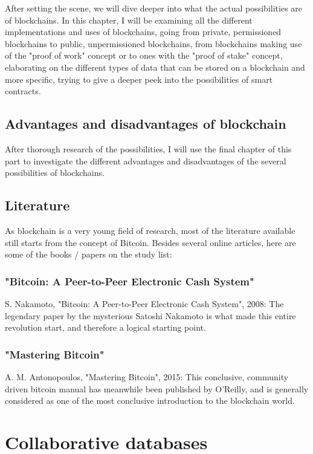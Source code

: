 \documentclass[11pt,a4paper]{article}
\begin{document}
After setting the scene, we will dive deeper into what the actual possibilities are of blockchains. In this chapter, I will be examining all the different implementations and uses of blockchains, going from private, permissioned blockchains to public, unpermissioned blockchains, from blockchains making use of the "proof of work" concept or to ones with the "proof of stake" concept, elaborating on the different types of data that can be stored on a blockchain and more specific, trying to give a deeper peek into the possibilities of smart contracts.

\subsection{Advantages and disadvantages of blockchain}

After thorough research of the possibilities, I will use the final chapter of this part to investigate the different advantages and disadvantages of the several possibilities of blockchains.

\subsection{Literature}

As blockchain is a very young field of research, most of the literature available still starts from the concept of Bitcoin. Besides several online articles, here are some of the books / papers on the study list:

\subsubsection{"Bitcoin: A Peer-to-Peer Electronic Cash System"}
S. Nakamoto, "Bitcoin: A Peer-to-Peer Electronic Cash System", 2008: The legendary paper by the mysterious Satoshi Nakamoto is what made this entire revolution start, and therefore a logical starting point.

\subsubsection{"Mastering Bitcoin"}
A. M. Antonopoulos, "Mastering Bitcoin", 2015: This conclusive, community driven bitcoin manual has meanwhile been published by O'Reilly, and is generally considered as one of the most conclusive introduction to the blockchain world.

\pagebreak
\section{Collaborative databases}
\end{document}
